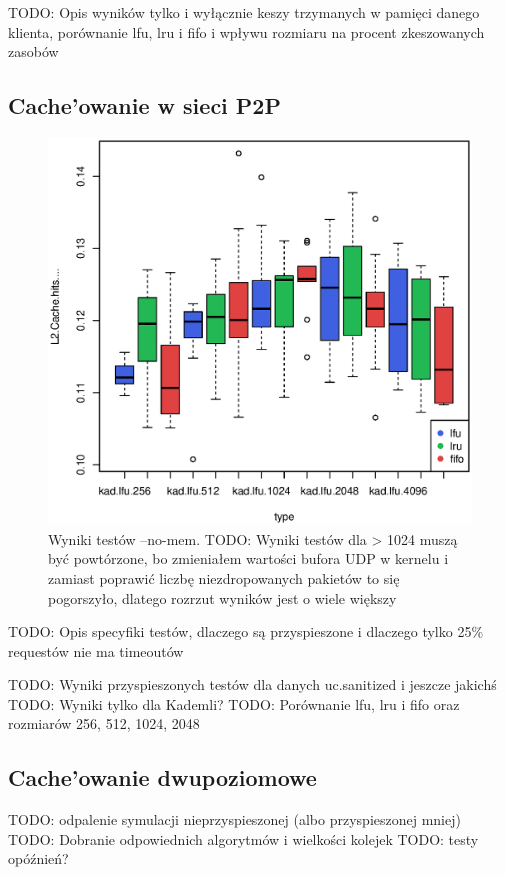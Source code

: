 \documentclass[a4paper,11pt]{scrartcl}
\newcommand{\s}{ }
\newcommand{\Keszowanie}{Cache'owanie}
\begin{document}
TODO: Opis wyników tylko i wyłącznie keszy trzymanych w pamięci danego klienta, porównanie lfu, lru i fifo i wpływu rozmiaru na procent zkeszowanych zasobów




\subsection{\Keszowanie\s w sieci P2P}

\begin{figure}[h!]
\includegraphics[width=0.95\linewidth]{img/cache.eps}
\caption{Wyniki testów --no-mem. TODO: Wyniki testów dla > 1024 muszą być powtórzone, bo zmieniałem wartości bufora UDP w kernelu i zamiast poprawić liczbę niezdropowanych pakietów to się pogorszyło, dlatego rozrzut wyników jest o wiele większy}
\end{figure}

TODO: Opis specyfiki testów, dlaczego są przyspieszone i dlaczego tylko 25\% requestów nie ma timeoutów

TODO: Wyniki przyspieszonych testów dla danych uc.sanitized i jeszcze jakichś
TODO: Wyniki tylko dla Kademli?
TODO: Porównanie lfu, lru i fifo oraz rozmiarów 256, 512, 1024, 2048


\subsection{\Keszowanie\s dwupoziomowe}
TODO: odpalenie symulacji nieprzyspieszonej (albo przyspieszonej mniej)
TODO: Dobranie odpowiednich algorytmów i wielkości kolejek
TODO: testy opóźnień?
\end{document}
